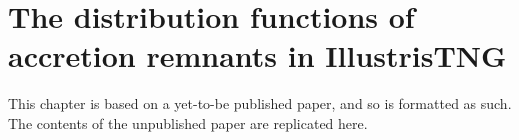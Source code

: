 \chapter{The distribution functions of accretion remnants in IllustrisTNG}

This chapter is based on a yet-to-be published paper, and so is formatted as such. The contents of the unpublished paper are replicated here.

